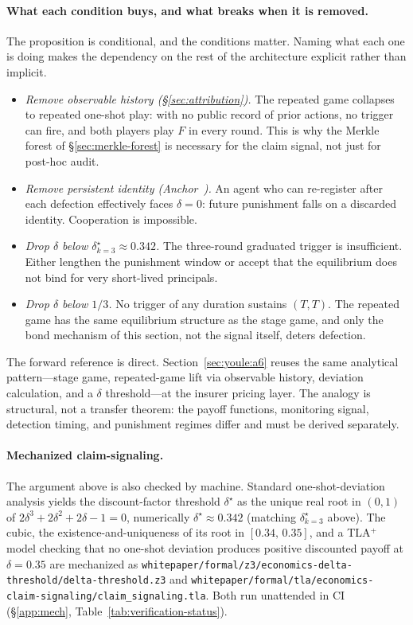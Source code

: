 \documentclass[11pt,a4paper]{article}
\theoremstyle{definition}
\theoremstyle{remark}
\begin{document}
\paragraph{What each condition buys, and what breaks when it is removed.}
The proposition is conditional, and the conditions matter. Naming what each one is doing makes the dependency on the rest of the architecture explicit rather than implicit.
\begin{itemize}[nosep]
  \item \emph{Remove observable history (\S\ref{sec:attribution}).} The repeated game collapses to repeated one-shot play: with no public record of prior actions, no trigger can fire, and both players play $F$ in every round. This is why the Merkle forest of \S\ref{sec:merkle-forest} is necessary for the claim signal, not just for post-hoc audit.
  \item \emph{Remove persistent identity (Anchor~\cite{owens2026anchor}).} An agent who can re-register after each defection effectively faces $\delta = 0$: future punishment falls on a discarded identity. Cooperation is impossible.
  \item \emph{Drop $\delta$ below $\delta^\star_{k=3} \approx 0.342$.} The three-round graduated trigger is insufficient. Either lengthen the punishment window or accept that the equilibrium does not bind for very short-lived principals.
  \item \emph{Drop $\delta$ below $1/3$.} No trigger of any duration sustains $(T, T)$. The repeated game has the same equilibrium structure as the stage game, and only the bond mechanism of this section, not the signal itself, deters defection.
\end{itemize}

The forward reference is direct. Section~\ref{sec:youle:a6} reuses the same analytical pattern---stage game, repeated-game lift via observable history, deviation calculation, and a $\delta$ threshold---at the insurer pricing layer. The analogy is structural, not a transfer theorem: the payoff functions, monitoring signal, detection timing, and punishment regimes differ and must be derived separately.

\paragraph{Mechanized claim-signaling.} The argument above is also checked by machine. Standard one-shot-deviation analysis yields the discount-factor threshold $\delta^\star$ as the unique real root in $(0,1)$ of $2\delta^3 + 2\delta^2 + 2\delta - 1 = 0$, numerically $\delta^\star \approx 0.342$ (matching $\delta^\star_{k=3}$ above). The cubic, the existence-and-uniqueness of its root in $[0.34,\,0.35]$, and a TLA$^{+}$ model checking that no one-shot deviation produces positive discounted payoff at $\delta = 0.35$ are mechanized as \texttt{whitepaper/formal/z3/economics-delta-threshold/delta-threshold.z3} and \texttt{whitepaper/formal/tla/economics-claim-signaling/claim\_signaling.tla}. Both run unattended in CI (\S\ref{app:mech}, Table~\ref{tab:verification-status}).
\end{document}
